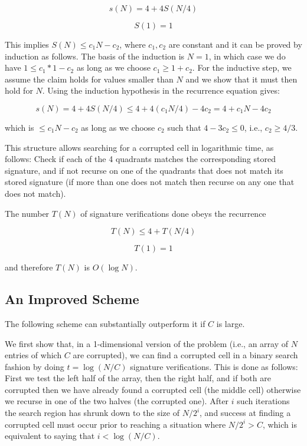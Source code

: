 \documentclass{llncs}
\begin{document}
$$s(N) = 4 + 4 S(N/4)$$

$$S(1) = 1$$

\noindent This implies $S(N) \leq c_1 N - c_2$,
where $c_1 , c_2$ are constant and it can be proved by induction
as follows.  The basis of the induction is $N=1$,
in which case we do have $1 \leq c_1 * 1 - c_2$ as
long as we choose $c_1 \geq 1 + c_2$. For
the inductive step, we assume the claim holds
for values smaller than $N$ and we show that it
must then hold for $N$.  Using the induction
hypothesis in the recurrence equation gives:

$$s(N) = 4 + 4 S(N/4) \leq 4 + 4 (c_1 N / 4 )  - 4c_2
=4 + c_1 N - 4 c_2$$

\noindent which is $\leq c_1 N - c_2$ as long as we choose
$c_2$ such that $4 -3c_2 \leq 0$, i.e., $c_2 \geq 4/3$.

This structure allows searching for a corrupted cell in
logarithmic time, as follows:
Check if each of the 4 quadrants matches the corresponding
stored signature, and if not recurse on one of
the quadrants that
does not match its stored signature (if more than 
one does not match then recurse on any one 
that does not match).

The number $T(N)$ of signature verifications done
obeys the recurrence

$$T(N) \leq 4 + T(N/4)$$

$$T(1) = 1$$

\noindent and therefore $T(N)$ is $O( \log N )$.

\subsection{An Improved Scheme}
\label{ImprovedScheme}

The following scheme can substantially outperform
it if $C$ is large.

We first show that, in a 1-dimensional version of
the problem (i.e., an array of $N$ entries of which
$C$ are corrupted), we can find a corrupted cell
in a binary search fashion by doing
$t = \log ( N / C )$ signature verifications.
This is done as follows:  First we test the left half of
the array, then the right half, and if both are
corrupted then we have already
found a corrupted cell (the middle cell) otherwise
we recurse in one of the two halves (the
corrupted one).   After $i$ such 
iterations the search region has shrunk down 
to the size of $N / 2^i$, and success at finding
a corrupted cell must occur prior to 
reaching a situation where $N / 2^i > C$,
which is equivalent to saying that 
$ i < \log ( N / C )$.   
\end{document}
